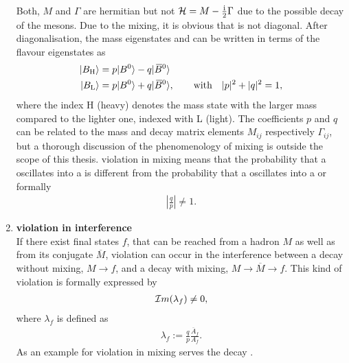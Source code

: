 \begin{enumerate}
          Both, $M$ and $\Gamma$ are hermitian but not $\mathcal{H} = M - \frac{\mathrm{i}}{2} \Gamma$ due to the possible decay of the mesons.
          Due to the mixing, it is obvious that \Ham is not diagonal.
          After diagonalisation, the mass eigenstates  and  can be written in terms of the flavour eigenstates as
          \begin{align}
              \ket{B_{\text{H}}\vphantom{\text{\Bdb}}} &= p \ket{\text{\Bd}\vphantom{\text{\Bdb}}} - q \ket{\text{\Bdb}} \label{eq:b_heavy}\\ 
              \ket{B_{\text{L}}\vphantom{\text{\Bdb}}} &= p \ket{\text{\Bd}\vphantom{\text{\Bdb}}} + q \ket{\text{\Bdb}}, \qquad \text{with} \quad |p|^2 + |q|^2 = 1, \label{eq:b_light}
          \end{align}
          where the index H (heavy) denotes the mass state with the larger mass compared to the lighter one, indexed with L (light).
          The coefficients $p$ and $q$ can be related to the mass and decay matrix elements $M_{ij}$ respectively $\Gamma_{ij}$, but a thorough discussion of the phenomenology of mixing is outside the scope of this thesis.
          \CP violation in mixing means that the probability that a \Bd oscillates into a \Bdb is different from the probability that a \Bdb oscillates into a \Bd or formally
          \begin{align}
              \left|\frac{q}{p}\right| \neq 1.
          \end{align}
    \item \textbf{\CP violation in interference} \\
          If there exist final states $f$, that can be reached from a hadron $M$ as well as from its \CP conjugate $\overline{M}$, \CP violation can occur in the interference between a decay without mixing, $M \to f$, and a decay with mixing, $M \to \overline{M} \to f$.
          This kind of \CP violation is formally expressed by
          \begin{align}
              \mathcal{I}m(\lambda_f) \neq 0,
          \end{align}
          where $\lambda_f$ is defined as
          \begin{align}
              \lambda_f := \frac{q}{p} \frac{\overline{A}_f}{A_f}.
          \end{align}
          As an example for \CP violation in mixing serves the decay \decay{\Bd/\Bdb}{\jpsi\KS}.
\end{enumerate}

